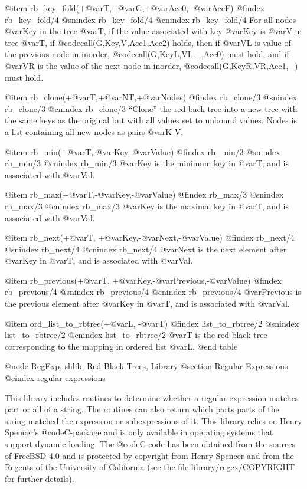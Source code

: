 @item rb_key_fold(+@var{T},+@var{G},+@var{Acc0}, -@var{AccF})
@findex rb_key_fold/4
@snindex rb_key_fold/4
@cnindex rb_key_fold/4
    For all nodes @var{Key} in the tree @var{T}, if the value
associated with key @var{Key} is @var{V} in tree @var{T}, if
@code{call(G,Key,V,Acc1,Acc2)} holds, then if @var{VL} is value of the
previous node in inorder, @code{call(G,KeyL,VL,_,Acc0)} must hold, and if
@var{VR} is the value of the next node in inorder,
@code{call(G,KeyR,VR,Acc1,_)} must hold.

@item rb_clone(+@var{T},+@var{NT},+@var{Nodes})
@findex rb_clone/3
@snindex rb_clone/3
@cnindex rb_clone/3
``Clone'' the red-back tree into a new tree with the same keys as the
original but with all values set to unbound values. Nodes is a list
containing all new nodes as pairs @var{K-V}.

@item rb_min(+@var{T},-@var{Key},-@var{Value})
@findex rb_min/3
@snindex rb_min/3
@cnindex rb_min/3
@var{Key}  is the minimum key in @var{T}, and is associated with @var{Val}.

@item rb_max(+@var{T},-@var{Key},-@var{Value})
@findex rb_max/3
@snindex rb_max/3
@cnindex rb_max/3
@var{Key}  is the maximal key in @var{T}, and is associated with @var{Val}.

@item rb_next(+@var{T}, +@var{Key},-@var{Next},-@var{Value})
@findex rb_next/4
@snindex rb_next/4
@cnindex rb_next/4
@var{Next} is the next element after @var{Key} in @var{T}, and is
associated with @var{Val}.

@item rb_previous(+@var{T}, +@var{Key},-@var{Previous},-@var{Value})
@findex rb_previous/4
@snindex rb_previous/4
@cnindex rb_previous/4
@var{Previous} is the previous element after @var{Key} in @var{T}, and is
associated with @var{Val}.

@item ord_list_to_rbtree(+@var{L}, -@var{T})
@findex list_to_rbtree/2
@snindex list_to_rbtree/2
@cnindex list_to_rbtree/2
@var{T} is the red-black tree corresponding to the mapping in ordered
list @var{L}.
@end table

@node RegExp, shlib, Red-Black Trees, Library
@section Regular Expressions
@cindex regular expressions

This library includes routines to determine whether a regular expression
matches part or all of a string. The routines can also return which
parts parts of the string matched the expression or subexpressions of
it. This library relies on Henry Spencer's @code{C}-package and is only
available in operating systems that support dynamic loading. The
@code{C}-code has been obtained from the sources of FreeBSD-4.0 and is
protected by copyright from Henry Spencer and from the Regents of the
University of California (see the file library/regex/COPYRIGHT for
further details).

